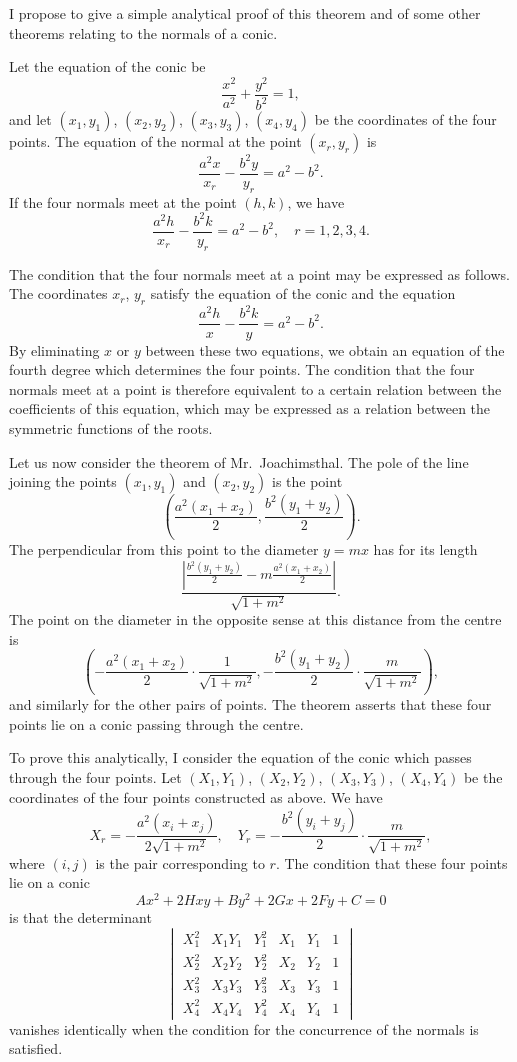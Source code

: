 \documentclass[11pt,a4paper]{article}
\begin{document}
I propose to give a simple analytical proof of this theorem and of some other theorems relating to the normals of a conic.

Let the equation of the conic be
\[
\frac{x^2}{a^2} + \frac{y^2}{b^2} = 1,
\]
and let $(x_1,y_1)$, $(x_2,y_2)$, $(x_3,y_3)$, $(x_4,y_4)$ be the coordinates of the four points. The equation of the normal at the point $(x_r,y_r)$ is
\[
\frac{a^2x}{x_r} - \frac{b^2y}{y_r} = a^2 - b^2.
\]
If the four normals meet at the point $(h,k)$, we have
\[
\frac{a^2h}{x_r} - \frac{b^2k}{y_r} = a^2 - b^2, \quad r=1,2,3,4.
\]

\setcounter{page}{76}

The condition that the four normals meet at a point may be expressed as follows. The coordinates $x_r$, $y_r$ satisfy the equation of the conic and the equation
\[
\frac{a^2h}{x} - \frac{b^2k}{y} = a^2 - b^2.
\]
By eliminating $x$ or $y$ between these two equations, we obtain an equation of the fourth degree which determines the four points. The condition that the four normals meet at a point is therefore equivalent to a certain relation between the coefficients of this equation, which may be expressed as a relation between the symmetric functions of the roots.

Let us now consider the theorem of Mr.~Joachimsthal. The pole of the line joining the points $(x_1,y_1)$ and $(x_2,y_2)$ is the point
\[
\left(\frac{a^2(x_1+x_2)}{2}, \frac{b^2(y_1+y_2)}{2}\right).
\]
The perpendicular from this point to the diameter $y = mx$ has for its length
\[
\frac{\left|\frac{b^2(y_1+y_2)}{2} - m\frac{a^2(x_1+x_2)}{2}\right|}{\sqrt{1+m^2}}.
\]
The point on the diameter in the opposite sense at this distance from the centre is
\[
\left(-\frac{a^2(x_1+x_2)}{2}\cdot\frac{1}{\sqrt{1+m^2}}, -\frac{b^2(y_1+y_2)}{2}\cdot\frac{m}{\sqrt{1+m^2}}\right),
\]
and similarly for the other pairs of points. The theorem asserts that these four points lie on a conic passing through the centre.

\setcounter{page}{77}

To prove this analytically, I consider the equation of the conic which passes through the four points. Let $(X_1,Y_1)$, $(X_2,Y_2)$, $(X_3,Y_3)$, $(X_4,Y_4)$ be the coordinates of the four points constructed as above. We have
\[
X_r = -\frac{a^2(x_i+x_j)}{2\sqrt{1+m^2}}, \quad
Y_r = -\frac{b^2(y_i+y_j)}{2}\cdot\frac{m}{\sqrt{1+m^2}},
\]
where $(i,j)$ is the pair corresponding to $r$. The condition that these four points lie on a conic
\[
Ax^2 + 2Hxy + By^2 + 2Gx + 2Fy + C = 0
\]
is that the determinant
\[
\begin{vmatrix}
X_1^2 & X_1Y_1 & Y_1^2 & X_1 & Y_1 & 1 \\
X_2^2 & X_2Y_2 & Y_2^2 & X_2 & Y_2 & 1 \\
X_3^2 & X_3Y_3 & Y_3^2 & X_3 & Y_3 & 1 \\
X_4^2 & X_4Y_4 & Y_4^2 & X_4 & Y_4 & 1
\end{vmatrix}
\]
vanishes identically when the condition for the concurrence of the normals is satisfied.
\end{document}
